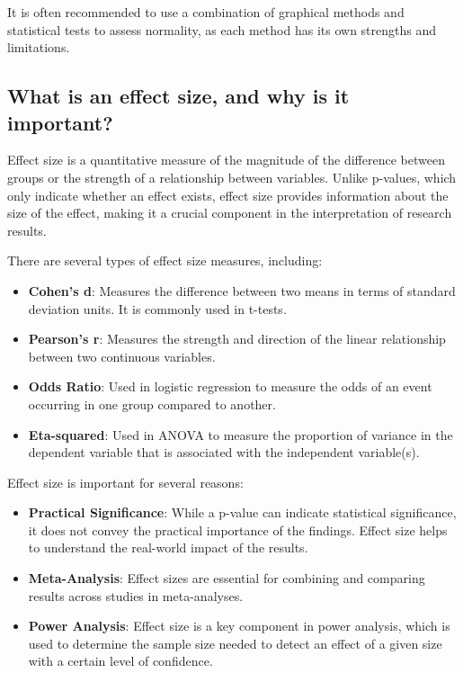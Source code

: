 \documentclass[12pt]{article}
\begin{document}
It is often recommended to use a combination of graphical methods and statistical tests to assess normality, as each method has its own strengths and limitations.

\subsection{What is an effect size, and why is it important?}

Effect size is a quantitative measure of the magnitude of the difference between groups or the strength of a relationship between variables. Unlike p-values, which only indicate whether an effect exists, effect size provides information about the size of the effect, making it a crucial component in the interpretation of research results.

There are several types of effect size measures, including:

\begin{itemize}
    \item \textbf{Cohen's d}: Measures the difference between two means in terms of standard deviation units. It is commonly used in t-tests.
    \item \textbf{Pearson's r}: Measures the strength and direction of the linear relationship between two continuous variables.
    \item \textbf{Odds Ratio}: Used in logistic regression to measure the odds of an event occurring in one group compared to another.
    \item \textbf{Eta-squared}: Used in ANOVA to measure the proportion of variance in the dependent variable that is associated with the independent variable(s).
\end{itemize}

Effect size is important for several reasons:

\begin{itemize}
    \item \textbf{Practical Significance}: While a p-value can indicate statistical significance, it does not convey the practical importance of the findings. Effect size helps to understand the real-world impact of the results.
    \item \textbf{Meta-Analysis}: Effect sizes are essential for combining and comparing results across studies in meta-analyses.
    \item \textbf{Power Analysis}: Effect size is a key component in power analysis, which is used to determine the sample size needed to detect an effect of a given size with a certain level of confidence.
\end{itemize}
\end{document}
